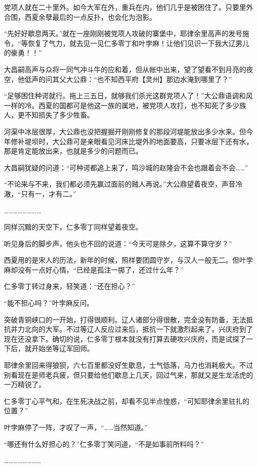 党项人就在二十里外。如今大军在外，重兵在内，他们几乎是被困住了。只要里外合围，西夏余孽最后的一点反扑，也会化为泡影。

“先好好歇息两天。”就在一座刚刚被党项人攻破的寨堡中，耶律余里高声的发号施令，“等恢复了气力，就去见一见仁多零丁和叶孛麻！让他们见识一下我大辽男儿的豪勇！！”

大昌嗣高声与众将一同气冲斗牛的应和着，但从帐中出来，望了望看不到月亮的夜空，他低声的问其父大公鼎：“也不知西平府【灵州】那边水淹到哪里了？”

“足够困住种谔就行。拖上三五日，就够我们杀光这群党项人了！”大公鼎语调和风一样的冷。西夏的国都可是他这一族的属地，被党项人攻打，也不知死了多少族人，更不知损失了多少牲畜。

河渠中冰层很厚，大公鼎也没把握掘开刚刚修复的那段河堤能放出多少水来。但今年修补堤坝时，大公鼎可是亲眼看见河床比堤外的地面要高，只要冰层下还有水，那是肯定能放出来，也就是多少的问题而已。

大昌嗣犹疑的问道：“可种谔都追上来了，鸣沙城的赵隆会不会也跟着会不会……”

“不论来与不来，我们都必须先赢过面前的贼人再说。”大公鼎望着夜空，声音冷澈，“只有一，才有二。”

……………………

同样沉黯的天空下，仁多零丁同样望着夜空。

听见身后的脚步声，他头也不回的说道：“今天可是除夕，这算不算守岁？”

西夏用的是宋人的历法，新年的时候，照样要团圆守岁，与汉人一般无二。但叶孛麻却没有一点好心情，“已经是孤注一掷了，还过什么年？”

仁多零丁转过身来，轻笑道：“还在担心？”

“能不担心吗？”叶孛麻反问。

突破青铜峡口的一开始，打得很顺利。辽人诸部分得很散，完全没有防备，无法抵抗并力北向的大军。不过等辽人反应过来后，抵抗一下就激烈起来了。兴庆府到了现在还没拿下。确切的说，仁多零丁根本就没有打算去硬攻兴庆府，而是试探了一下后，就开始坐等辽军回师。

耶律余里回来得狼狈，六七百里都没好生歇息，士气低落，马力也消耗极大。不过别看现在是师老兵疲，但只要给他们歇息上几天，回过气来，那就又是生龙活虎的一万精锐了。

仁多零丁心平气和，在生死决战之前，却看不见半点惶惑，“可知耶律余里驻扎的位置？”

叶孛麻停了一阵，才叹了一声，“……当然知道。”

“哪还有什么好担心的？”仁多零丁笑问道，“不是如事前所料吗？”

……………………

